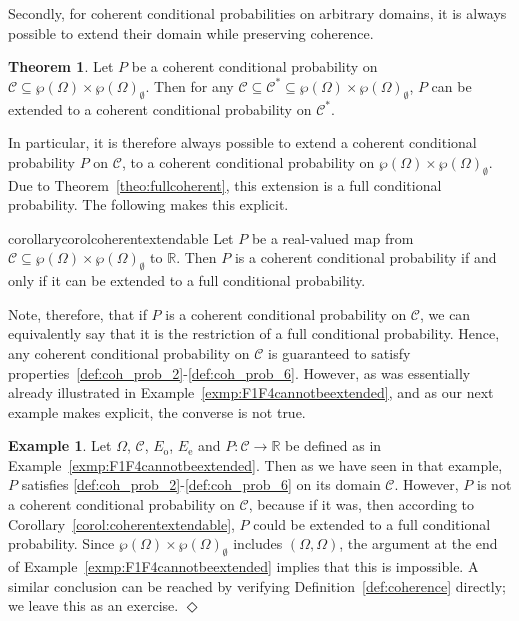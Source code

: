 \documentclass[10pt,a4paper]{paper}
\theoremstyle{definition}
\newtheorem{exmp}{Example}
\newtheorem{theorem}{Theorem}[section]
\newcommand{\reals}{\mathbb{R}}
\newcommand{\paths}{\Omega}
\newcommand{\power}{\wp(\paths)}
\newcommand{\nonemptypower}{\power_{\emptyset}}
\newcommand{\exampleend}{\hfill$\Diamond$}
\begin{document}
Secondly, for coherent conditional probabilities on arbitrary domains, it is always possible to extend their domain while preserving coherence.

\begin{theorem}{\cite[Theorem 4]{regazzini1985finitely}}\label{theo:largerdomain}
Let $P$ be a coherent conditional probability on $\mathcal{C}\subseteq\power\times\nonemptypower$. Then for any $\mathcal{C}\subseteq\mathcal{C}^*\subseteq\power\times\nonemptypower$, $P$ can be extended to a coherent conditional probability on $\mathcal{C}^*$.
\end{theorem}
In particular, it is therefore always possible to extend a coherent conditional probability $P$ on $\mathcal{C}$, to a coherent conditional probability on $\power\times\nonemptypower$. Due to Theorem~\ref{theo:fullcoherent}, this extension is a full conditional probability. The following makes this explicit.

\begin{restatable}{corollary}{corolcoherentextendable}
\label{corol:coherentextendable}
Let $P$ be a real-valued map from $\mathcal{C}\subseteq\power\times\nonemptypower$ to $\reals$. Then $P$ is a coherent conditional probability if and only if it can be extended to a full conditional probability.
\end{restatable}
Note, therefore, that if $P$ is a coherent conditional probability on $\mathcal{C}$, we can equivalently say that it is the restriction of a full conditional probability. Hence, any coherent conditional probability on $\mathcal{C}$ is guaranteed to satisfy properties~\ref{def:coh_prob_2}-\ref{def:coh_prob_6}. However, as was essentially already illustrated in Example~\ref{exmp:F1F4cannotbeextended}, and as our next example makes explicit, the converse is not true.

\begin{exmp}
Let $\Omega$, $\mathcal{C}$, $E_{\mathrm{o}}$, $E_{\mathrm{e}}$ and $P\colon\mathcal{C}\to\reals$ be defined as in Example~\ref{exmp:F1F4cannotbeextended}. Then as we have seen in that example, $P$ satisfies \ref{def:coh_prob_2}-\ref{def:coh_prob_6} on its domain $\mathcal{C}$. However, $P$ is not a coherent conditional probability on $\mathcal{C}$, because if it was, then according to Corollary~\ref{corol:coherentextendable}, $P$ could be extended to a full conditional probability. Since $\power\times\nonemptypower$ includes $(\Omega,\Omega)$, the argument at the end of Example~\ref{exmp:F1F4cannotbeextended} implies that this is impossible.
A similar conclusion can be reached by verifying Definition~\ref{def:coherence} directly; we leave this as an exercise.
\exampleend
\end{exmp}
\end{document}
